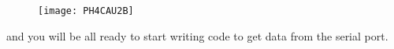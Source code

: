\begin{figure}[h!]
	\centering
	\texttt{[image: PH4CAU2B]}
\end{figure}

and you will be all ready to start writing code to get data from the serial
port.

%
%
%
%
%
%
